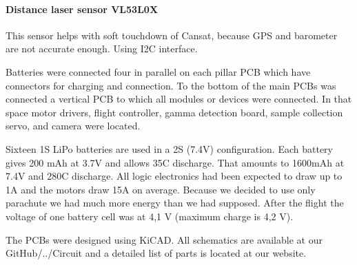 \documentclass{cfp}
\begin{document}
\paragraph{Distance laser sensor VL53L0X}This sensor helps with soft touchdown of Cansat, because GPS and barometer are not accurate enough. Using I2C interface.
\par Batteries were connected four in parallel on each pillar PCB which have connectors for charging and connection. To the bottom of the main PCBs was connected a vertical PCB to which all modules or devices were connected. In that space motor drivers, flight controller, gamma detection board, sample collection servo, and camera were located.
\par Sixteen 1S LiPo batteries are used in a 2S (7.4V) configuration. Each battery gives 200 mAh at 3.7V and allows 35C discharge. That amounts to 1600mAh at 7.4V and 280C discharge. All logic electronics had been expected to draw up to 1A and the motors draw 15A on average. Because we decided to use only parachute we had much more energy than we had supposed. After the flight the voltage of one battery cell was at 4,1 V (maximum charge is 4,2 V). 
\par The PCBs were designed using KiCAD. All schematics are available at our GitHub/../Circuit \cite{Git-Circuit} and a detailed list of parts is located at our website. \cite{Websites}
\end{document}
